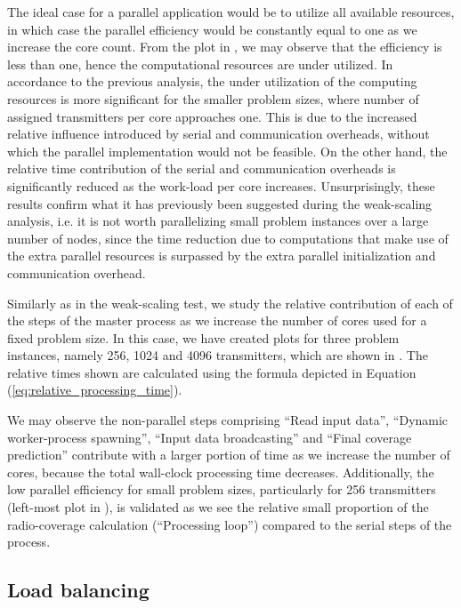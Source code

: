 The ideal case for a parallel application would be to utilize all
available resources, in which case the parallel efficiency would be
constantly equal to one as we increase the core count. From the plot
in , we may observe
that the efficiency is less than one, hence the computational resources
are under utilized. In accordance to the previous analysis, the under
utilization of the computing resources is more significant for the
smaller problem sizes, where number of assigned transmitters per core
approaches one. This is due to the increased relative influence introduced
by serial and communication overheads, without which the parallel
implementation would not be feasible. On the other hand, the relative
time contribution of the serial and communication overheads is significantly
reduced as the work-load per core increases. Unsurprisingly, these
results confirm what it has previously been suggested during the weak-scaling
analysis, i.e. it is not worth parallelizing small problem instances
over a large number of nodes, since the time reduction due to computations
that make use of the extra parallel resources is surpassed by the
extra parallel initialization and communication overhead.

Similarly as in the weak-scaling test, we study the relative contribution
of each of the steps of the master process as we increase the number
of cores used for a fixed problem size. In this case, we have created
plots for three problem instances, namely 256, 1024 and 4096 transmitters,
which are shown in .
The relative times shown are calculated using the formula depicted
in Equation (\ref{eq:relative_processing_time}).

We may observe the non-parallel steps comprising ``Read input data'',
``Dynamic worker-process spawning'', ``Input data broadcasting''
and ``Final coverage prediction'' contribute with a larger portion
of time as we increase the number of cores, because the total wall-clock
processing time decreases. Additionally, the low parallel efficiency
for small problem sizes, particularly for 256 transmitters (left-most
plot in ), is validated
as we see the relative small proportion of the radio-coverage calculation
(``Processing loop'') compared to the serial steps of the process.


\subsection{Load balancing}

